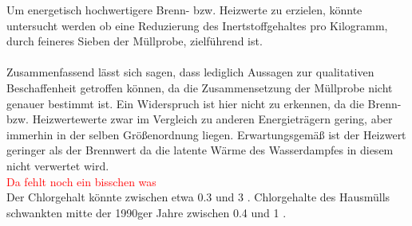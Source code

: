 Um energetisch hochwertigere Brenn- bzw. Heizwerte zu erzielen, könnte untersucht werden ob eine Reduzierung des Inertstoffgehaltes pro Kilogramm, durch feineres Sieben der Müllprobe, zielführend ist.\\ \\
Zusammenfassend lässt sich sagen, dass lediglich Aussagen zur qualitativen Beschaffenheit getroffen können, da die Zusammensetzung der Müllprobe nicht genauer bestimmt ist. Ein Widerspruch ist hier nicht zu erkennen, da die Brenn- bzw. Heizwertewerte zwar im Vergleich zu anderen Energieträgern gering, aber immerhin in der selben Größenordnung liegen.\linebreak
Erwartungsgemäß ist der Heizwert geringer als der Brennwert da die latente Wärme des Wasserdampfes in diesem nicht verwertet wird.\\

\textcolor{red}{Da fehlt noch ein bisschen was}\\
Der Chlorgehalt könnte zwischen etwa \SI{0,3}{\mpercent} und \SI{3}{\mpercent} \cite{LLA_Abfallanalyse}. Chlorgehalte des Hausmülls schwankten mitte der 1990ger Jahre zwischen \SI{0,4}{\mpercent} und \SI{1}{\mpercent} \cite{scholz2013}.
%


